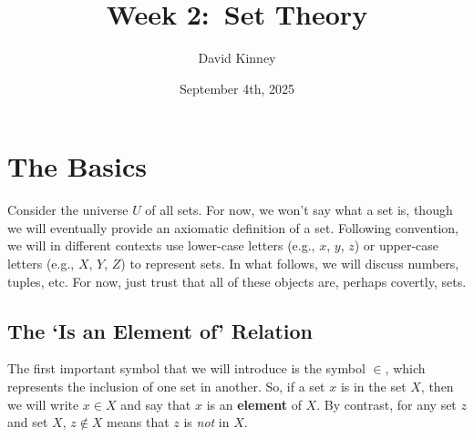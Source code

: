 \documentclass[11pt]{article}
\title{Week 2:\ Set Theory}
\author{David Kinney}
\date{September 4th, 2025}
\theoremstyle{definition}
\theoremstyle{remark}
\begin{document}
\maketitle

\section{The Basics}
Consider the universe $U$ of all sets. For now, we won't say what a set is, though we will eventually provide an axiomatic definition of a set. Following convention, we will in different contexts use lower-case letters (e.g., $x$, $y$, $z$) or upper-case letters (e.g., $X$, $Y$, $Z$) to represent sets. In what follows, we will discuss numbers, tuples, etc. For now, just trust that all of these objects are, perhaps covertly, sets. 

\subsection{The `Is an Element of' Relation}
The first important symbol that we will introduce is the symbol $\in$, which represents the inclusion of one set in another. So, if a set $x$ is in the set $X$, then we will write $x\in X$ and say that $x$ is an \textbf{element} of $X$. By contrast, for any set $z$ and set $X$, $z\not\in X$ means that $z$ is \textit{not} in $X$.
\end{document}
